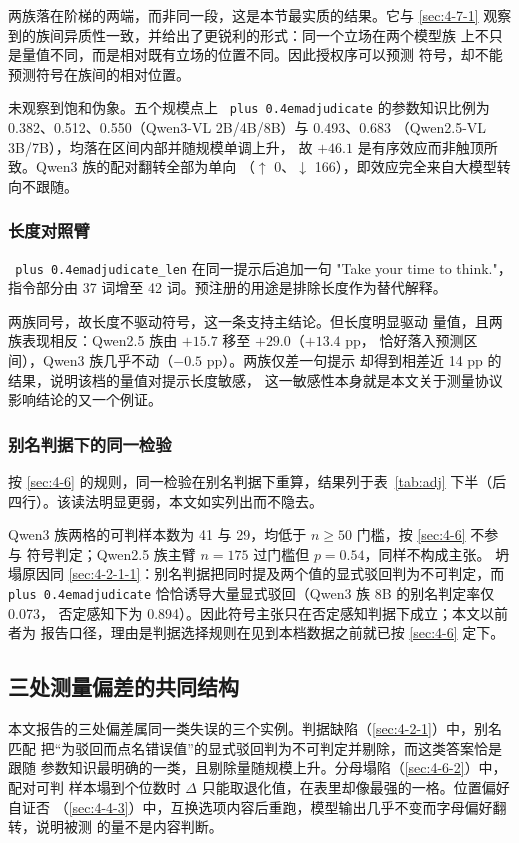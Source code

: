 \documentclass[10.5pt,compsoc,UTF8]{CjC}
\theoremstyle{mystyle}
\DeclareRobustCommand{\code}[1]{\texttt{\spaceskip=0pt plus 0.4em\relax#1}}
\begin{document}
两族落在阶梯的两端，而非同一段，这是本节最实质的结果。它与 \ref{sec:4-7-1}
观察到的族间异质性一致，并给出了更锐利的形式：同一个立场在两个模型族
上不只是量值不同，而是相对既有立场的位置不同。因此授权序可以预测
符号，却不能预测符号在族间的相对位置。

未观察到饱和伪象。五个规模点上 \code{adjudicate} 的参数知识比例为
0.382、0.512、0.550（Qwen3-VL 2B/4B/8B）与 0.493、0.683
（Qwen2.5-VL 3B/7B），均落在区间内部并随规模单调上升，
故 $+46.1$ 是有序效应而非触顶所致。Qwen3 族的配对翻转全部为单向
（$\uparrow$ 0、$\downarrow$ 166），即效应完全来自大模型转向不跟随。

\subsubsection{长度对照臂}
\label{sec:4-9-4}

\code{adjudicate\_len} 在同一提示后追加一句 "Take your time to think."，
指令部分由 37 词增至 42 词。预注册的用途是排除长度作为替代解释。

两族同号，故长度不驱动符号，这一条支持主结论。但长度明显驱动
量值，且两族表现相反：Qwen2.5 族由 $+15.7$ 移至 $+29.0$（$+13.4$ pp，
恰好落入预测区间），Qwen3 族几乎不动（$-0.5$ pp）。两族仅差一句提示
却得到相差近 14 pp 的结果，说明该档的量值对提示长度敏感，
这一敏感性本身就是本文关于测量协议影响结论的又一个例证。

\subsubsection{别名判据下的同一检验}
\label{sec:4-9-5}

按 \ref{sec:4-6} 的规则，同一检验在别名判据下重算，结果列于表~\ref{tab:adj}
下半（后四行）。该读法明显更弱，本文如实列出而不隐去。

Qwen3 族两格的可判样本数为 41 与 29，均低于 $n\ge50$ 门槛，按 \ref{sec:4-6} 不参与
符号判定；Qwen2.5 族主臂 $n=175$ 过门槛但 $p=0.54$，同样不构成主张。
坍塌原因同 \ref{sec:4-2-1-1}：别名判据把同时提及两个值的显式驳回判为不可判定，而
\code{adjudicate} 恰恰诱导大量显式驳回（Qwen3 族 8B 的别名判定率仅 0.073，
否定感知下为 0.894）。因此符号主张只在否定感知判据下成立；本文以前者为
报告口径，理由是判据选择规则在见到本档数据之前就已按 \ref{sec:4-6} 定下。


\subsection{三处测量偏差的共同结构}
\label{sec:4-10}

本文报告的三处偏差属同一类失误的三个实例。判据缺陷（\ref{sec:4-2-1}）中，别名匹配
把“为驳回而点名错误值”的显式驳回判为不可判定并剔除，而这类答案恰是跟随
参数知识最明确的一类，且剔除量随规模上升。分母塌陷（\ref{sec:4-6-2}）中，配对可判
样本塌到个位数时 $\Delta$ 只能取退化值，在表里却像最强的一格。位置偏好自证否
（\ref{sec:4-4-3}）中，互换选项内容后重跑，模型输出几乎不变而字母偏好翻转，说明被测
的量不是内容判断。
\end{document}
